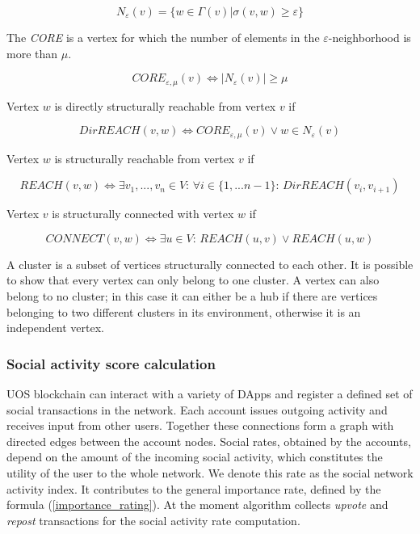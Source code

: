 \documentclass[a4paper,12pt]{article}
\begin{document}
$$
N_{\varepsilon}(v) = \{ w \in \Gamma(v) | \sigma(v,w) \ge \varepsilon \}
$$

The \textit{CORE} is a vertex for which the number of elements in the $\varepsilon$-neighborhood is more than $\mu$.

$$
CORE_{\varepsilon,\mu}(v) \Leftrightarrow |N_{\varepsilon} (v)| \ge \mu
$$

Vertex $w$ is directly structurally reachable from vertex $v$ if



$$
DirREACH(v,w) \Leftrightarrow CORE_{\varepsilon,\mu}(v) \vee w \in N_{\varepsilon}(v)
$$

Vertex $w$ is structurally reachable from vertex $v$ if


$$
REACH(v,w) \Leftrightarrow \exists v_1,...,v_n \in V \text{: } \forall i \in \{1,...n-1\} \text{: } DirREACH(v_i,v_{i+1})
$$

Vertex $v$ is structurally connected with vertex $w$ if



$$
CONNECT(v,w) \Leftrightarrow \exists u \in V\text{: } REACH(u,v) \vee REACH(u,w)
$$

A cluster is a subset of vertices structurally connected to each other. It is possible to show that every vertex can only belong to one cluster. A vertex can also belong to no cluster; in this case it can either be a hub if there are vertices belonging to two different clusters in its environment, otherwise it is an independent vertex.




\subsubsection{Social activity score calculation}

U{\degree}OS blockchain can interact with a variety of DApps and register a defined set of social transactions in the network. Each account issues outgoing activity and receives input from other users. Together these connections form a graph with directed edges between the account nodes. Social rates, obtained by the accounts, depend on the amount of the incoming social activity, which constitutes the utility of the user to the whole network. We denote this rate as the social network activity index. It contributes to the general importance rate, defined by the formula (\ref{importance_rating}). At the moment algorithm collects \emph{upvote} and \emph{repost} transactions for the social activity rate computation. 
\end{document}
